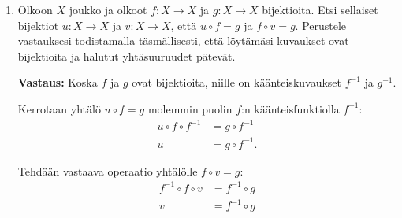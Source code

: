 \documentclass[a4paper,12pt]{article}
\begin{document}
\begin{enumerate}
\begin{enumerate}
\item $f:  3\mathbb{N} \setminus \{0,3\} \to 5\mathbb{N}$, $f(n)=5(n-6)/3$.

\textbf{Vastaus:} Ratkaistaan käänteiskuvaus $f^{-1}$. Asetetaan $f(n)=y$ ja vaihdetaan $n\leftarrow y$
\begin{align*}
    n&=5(y-6)/3 \\
    3n&=5(y-6)\\
    3n&=5y-5\cdot 6\\
    3n+5\cdot 6&=5y\\
    \frac{3n}{5}+\frac{5\cdot 6}{5}&=y\\
    y&=\frac{3n}{5}+6.    
\end{align*}
Saadaan ehdotus käänteiskuvaukseksi: $f^{-1}=\frac{3n}{5}+6$. Kun $n\in 5\N$ (eli n jaollinen viidellä koska käänteiskuvauksen lähtöjoukko on $5\N$), voidaan lausekkeeseen sijoittaa n:n paikalle $5k$, jolloin lausekkeen arvoksi saadaan luonnollisia lukuja, jotka kuuluvat joukkoon $3\N \setminus \{0,3\}$ ja ovat vähintään 6. Käänteiskuvaus osuu siis oikeaan lähtöjoukkoon $3\N$. Koska funktiolla on käänteiskuvaus, täytyy funktion olla bijektio. 

\end{enumerate}
Miksi b)-kohdassa t\"aytyy rajata luvut $0$ ja $3$ pois m\"a\"arittelyjoukosta?

\textbf{Vastaus:} b)-kohdassa täytyi rajata luvut 0 ja 3 pois, koska ne ovat ainoa luonnolliset luvut, jotka tuottaisivat kuvauksella negatiivisia arvoja, eivätkä negatiiviset arvot sovi kuvauksen maalijoukkoon. 

\item Olkoon $X$ joukko ja olkoot $f: X \to X$ ja $g: X \to X$ bijektioita.
Etsi sellaiset bijektiot $u: X \to X$ ja $v: X \to X$,
ett\"a $u \circ f=g$ ja $f \circ v=g$. Perustele vastauksesi todistamalla t\"asm\"allisesti, ett\"a l\"oyt\"am\"asi kuvaukset ovat bijektioita ja halutut yht\"asuuruudet p\"atev\"at. 

\textbf{Vastaus:} Koska $f$ ja $g$ ovat bijektioita, niille on käänteiskuvaukset $f^{-1}$ ja $g^{-1}$.

Kerrotaan yhtälö $u\circ f = g$ molemmin puolin $f$:n käänteisfunktiolla $f^{-1}$:
\begin{align*}
    u\circ f\circ f^{-1} &= g\circ  f^{-1}\\
    u &= g\circ  f^{-1}.
\end{align*}

Tehdään vastaava operaatio yhtälölle $f \circ v=g$:
\begin{align*}
    f^{-1}\circ f \circ v &=f^{-1}\circ g\\
    v &= f^{-1}\circ g
\end{align*}


\end{enumerate}
\end{document}
